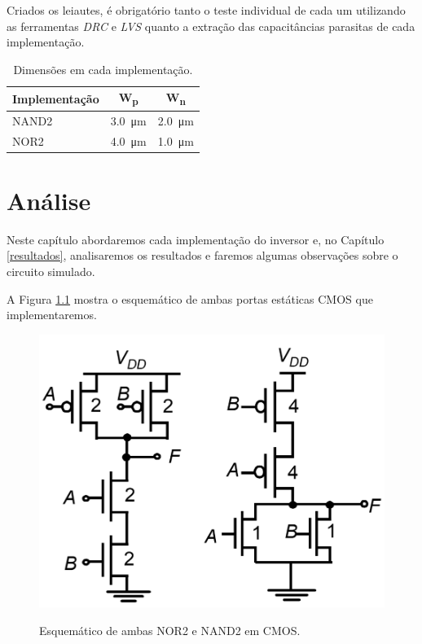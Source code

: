 \documentclass{iiufrgs}
\begin{document}
Criados os leiautes, é obrigatório tanto o teste individual de cada um utilizando as ferramentas \textit{DRC} e \textit{LVS} quanto a extração das capacitâncias parasitas de cada implementação.

\begin{table}[ht]
    \centering
    \caption{Dimensões em cada implementação.}
    \label{tab:imp}
    \begin{tabular}{l c c}
        \hline
        Implementação
        & W\textsubscript{p}
        & W\textsubscript{n} \\ \hline
        NAND2 & \SI{3.0}{\um}   & \SI{2.0}{\um}     \\ 
        NOR2 & \SI{4.0}{\um}    & \SI{1.0}{\um}     \\ \hline
    \end{tabular}
\end{table}

\chapter{Análise}\label{analise}
Neste capítulo abordaremos cada implementação do inversor e, no Capítulo \ref{resultados}, analisaremos os resultados e faremos algumas observações sobre o circuito simulado.

A Figura \ref{fig:both} mostra o esquemático de ambas portas estáticas CMOS que implementaremos.

\begin{figure}[htbp]
    \centering
    \caption{Esquemático de ambas NOR2 e NAND2 em CMOS.}
    \includegraphics[scale=0.6]{images/new/schem_both.png}
    \label{fig:both}
\end{figure}
\end{document}

